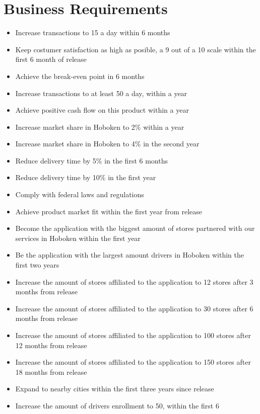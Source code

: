 \section{Business Requirements}
\begin{itemize}
    \item Increase transactions to 15 a day within 6 months
    \item Keep costumer satisfaction as high as posible, a 9 out of a 10 
    scale within the first 6 month of release
    \item Achieve the break-even point in 6 months
    \item Increase transactions to at least 50 a day, within a year
    \item Achieve positive cash flow on this product within a year
    \item Increase market share in Hoboken to 2\% within a year
    \item Increase market share in Hoboken to 4\% in the second year
    \item Reduce delivery time by 5\% in the first 6 months
    \item Reduce delivery time by 10\% in the first year
    \item Comply with federal laws and regulations
    \item Achieve product market fit within the first year from release
    \item Become the application with the biggest amount of stores partnered 
    with our services in Hoboken within the first year
    \item Be the application with the largest amount drivers in Hoboken 
    within the first two years
    \item Increase the amount of stores affiliated to the application to 12 
    stores after 3 months from release
    \item Increase the amount of stores affiliated to the application to 30 
    stores after 6 months from release
    \item Increase the amount of stores affiliated to the application to 100 
    stores after 12 months from release
    \item Increase the amount of stores affiliated to the application to 150 
    stores after 18 months from release
    \item Expand to nearby cities within the first three years since release
    \item Increase the amount of drivers enrollment to 50, within the first 6 

\end{itemize}
